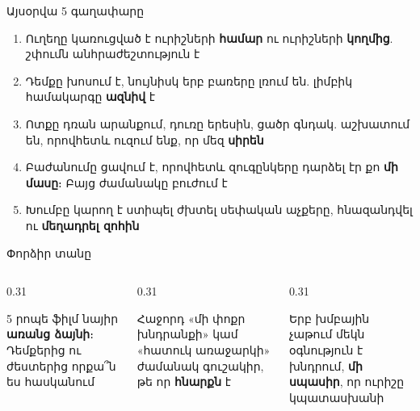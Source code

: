 \notopic

\begin{frame}{Այսօրվա 5 գաղափարը}
  \begin{enumerate}
    \item<1-> Ուղեղը կառուցված է ուրիշների \textbf{համար} ու ուրիշների \textbf{կողմից}. շփումն անհրաժեշտություն է
    \item<2-> Դեմքը խոսում է, նույնիսկ երբ բառերը լռում են. լիմբիկ համակարգը \textbf{ազնիվ} է
    \item<3-> Ոտքը դռան արանքում, դուռը երեսին, ցածր գնդակ. աշխատում են, որովհետև ուզում ենք, որ մեզ \textbf{սիրեն}
    \item<4-> Բաժանումը ցավում է, որովհետև զուգընկերը դարձել էր քո \textbf{մի մասը}։ Բայց ժամանակը բուժում է
    \item<5-> Խումբը կարող է ստիպել ժխտել սեփական աչքերը, հնազանդվել ու \textbf{մեղադրել զոհին}
  \end{enumerate}
\end{frame}

\begin{frame}{Փորձիր տանը}
  \begin{columns}[T]
    \begin{column}{0.31\textwidth}
      \begin{card}[colback=mint!30!cardwhite]
        \centering{}\par\smallskip
        \raggedright 5 րոպե ֆիլմ նայիր \textbf{առանց ձայնի}։ Դեմքերից ու ժեստերից որքա՞ն ես հասկանում
      \end{card}
    \end{column}
    \begin{column}{0.31\textwidth}
      \begin{card}[colback=butter!45!cream]
        \centering{}\par\smallskip
        \raggedright Հաջորդ «մի փոքր խնդրանքի» կամ «հատուկ առաջարկի» ժամանակ գուշակիր, թե որ \textbf{հնարքն} է
      \end{card}
    \end{column}
    \begin{column}{0.31\textwidth}
      \begin{card}[colback=lavender!35!cardwhite]
        \centering{}\par\smallskip
        \raggedright Երբ խմբային չաթում մեկն օգնություն է խնդրում, \textbf{մի սպասիր}, որ ուրիշը կպատասխանի
      \end{card}
    \end{column}
  \end{columns}
\end{frame}

